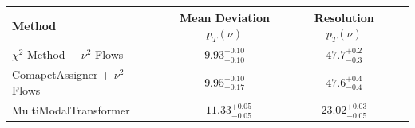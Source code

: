     \begin{tabular}{lccc}
        \toprule
        Method & Mean Deviation $p_{T}({\nu})$ & Resolution $p_{T}({\nu})$ \\
        \midrule
        $\chi^2$-Method + $\nu^2$-Flows & $9.93^{+0.10}_{-0.10}$ & $47.7^{+0.2}_{-0.3}$ \\
        ComapctAssigner + $\nu^2$-Flows & $9.95^{+0.10}_{-0.17}$ & $47.6^{+0.4}_{-0.4}$ \\
        MultiModalTransformer & $-11.33^{+0.05}_{-0.05}$ & $23.02^{+0.03}_{-0.05}$ \\
        \bottomrule
    \end{tabular}